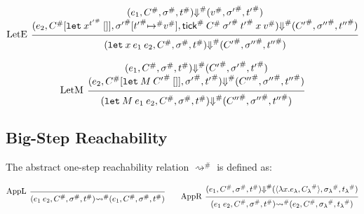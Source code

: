 \documentclass{article}
\theoremstyle{definition}
\newcommand*{\A}[1]{{#1}^{\#}}
\newcommand*{\tick}{\mathsf{tick}}
\begin{document}
\[
  \begin{prooftree}
    \hypo{
      \begin{matrix}
        (e_{1}, \A{C}, \A{\sigma}, \A{t})
        \A\Downarrow
        (\A{v}, \A{\sigma'}, \A{t'}) \\
        (e_{2}, \A{C}[\mathtt{let}\:x^{\A{t'}}\:[]], \A{\sigma'}[\A{t'}\A{\mapsto} \A{v}], \A{\tick}\:\A{C}\:\A{\sigma'}\:\A{t'}\:x\:\A{v})
        \A\Downarrow
        (\A{C'}, \A{\sigma''}, \A{t''})
      \end{matrix}
    }
    \infer[left label=LetE]1{
    (\mathtt{let}\:x\:e_1\:e_2, \A{C}, \A{\sigma}, \A{t})
    \A\Downarrow
    (\A{C'}, \A{\sigma''}, \A{t''})
    }
  \end{prooftree}
\]

\[
  \begin{prooftree}
    \hypo{
      \begin{matrix}
        (e_{1}, \A{C}, \A{\sigma}, \A{t})
        \A\Downarrow
        (\A{C'}, \A{\sigma'}, \A{t'}) \\
        (e_{2}, \A{C}[\mathtt{let}\:M\:\A{C'}\:[]], \A{\sigma'}, \A{t'})
        \A\Downarrow
        (\A{C''}, \A{\sigma''}, \A{t''})
      \end{matrix}
    }
    \infer[left label=LetM]1{
    (\mathtt{let}\:M\:e_{1}\:e_{2}, \A{C}, \A{\sigma}, \A{t})
    \A\Downarrow
    (\A{C''}, \A{\sigma''}, \A{t''})
    }
  \end{prooftree}
\]

\subsection{Big-Step Reachability}
The abstract one-step reachability relation $\A\rightsquigarrow$ is defined as:

\[
  \begin{prooftree}
    \infer[left label={AppL}]0{
    (e_{1}\:e_{2}, \A{C}, \A{\sigma}, \A{t})
    \A\rightsquigarrow
    (e_{1}, \A{C}, \A{\sigma}, \A{t})
    }
  \end{prooftree}\qquad
  \begin{prooftree}
    \hypo{
      \begin{matrix}
        (e_{1}, \A{C}, \A{\sigma}, \A{t})
        \A{\Downarrow}
        (\langle\lambda x.e_{\lambda}, \A{C_{\lambda}}\rangle, \A{\sigma_{\lambda}}, \A{t_{\lambda}})
      \end{matrix}
    }
    \infer[left label={AppR}]1{
    (e_{1}\:e_{2}, \A{C}, \A{\sigma}, \A{t})
    \A\rightsquigarrow
    (e_{2}, \A{C}, \A{\sigma_{\lambda}}, \A{t_{\lambda}})
    }
  \end{prooftree}
\]
\end{document}
